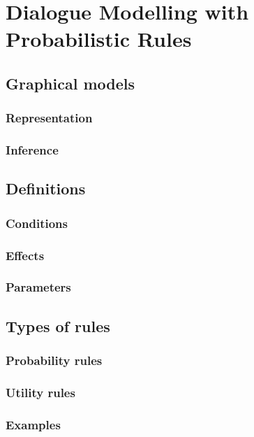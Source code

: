 \chapter{Dialogue Modelling with Probabilistic Rules}
\label{chap:rules}

\section{Graphical models}

\subsection{Representation}

\subsection{Inference}

\section{Definitions}

\subsection{Conditions}

\subsection{Effects}

\subsection{Parameters}

\section{Types of rules}

\subsection{Probability rules}

\subsection{Utility rules}

\subsection{Examples}

